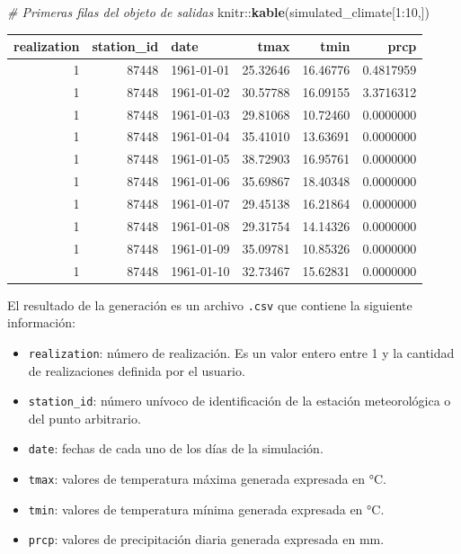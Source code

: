 \documentclass[
]{article}
\newenvironment{Shaded}{}{}
\newcommand{\CommentTok}[1]{\textcolor[rgb]{0.38,0.63,0.69}{\textit{#1}}}
\newcommand{\DecValTok}[1]{\textcolor[rgb]{0.25,0.63,0.44}{#1}}
\newcommand{\KeywordTok}[1]{\textcolor[rgb]{0.00,0.44,0.13}{\textbf{#1}}}
\newcommand{\NormalTok}[1]{#1}
\newcommand{\OperatorTok}[1]{\textcolor[rgb]{0.40,0.40,0.40}{#1}}
\providecommand{\tightlist}{%
  \setlength{\itemsep}{0pt}\setlength{\parskip}{0pt}}
\begin{document}
\begin{Shaded}
\begin{Highlighting}[]
\CommentTok{# Primeras filas del objeto de salidas}
\NormalTok{knitr}\OperatorTok{::}\KeywordTok{kable}\NormalTok{(simulated_climate[}\DecValTok{1}\OperatorTok{:}\DecValTok{10}\NormalTok{,])}
\end{Highlighting}
\end{Shaded}

\begin{tabular}{r|r|l|r|r|r}
\hline
realization & station\_id & date & tmax & tmin & prcp\\
\hline
1 & 87448 & 1961-01-01 & 25.32646 & 16.46776 & 0.4817959\\
\hline
1 & 87448 & 1961-01-02 & 30.57788 & 16.09155 & 3.3716312\\
\hline
1 & 87448 & 1961-01-03 & 29.81068 & 10.72460 & 0.0000000\\
\hline
1 & 87448 & 1961-01-04 & 35.41010 & 13.63691 & 0.0000000\\
\hline
1 & 87448 & 1961-01-05 & 38.72903 & 16.95761 & 0.0000000\\
\hline
1 & 87448 & 1961-01-06 & 35.69867 & 18.40348 & 0.0000000\\
\hline
1 & 87448 & 1961-01-07 & 29.45138 & 16.21864 & 0.0000000\\
\hline
1 & 87448 & 1961-01-08 & 29.31754 & 14.14326 & 0.0000000\\
\hline
1 & 87448 & 1961-01-09 & 35.09781 & 10.85326 & 0.0000000\\
\hline
1 & 87448 & 1961-01-10 & 32.73467 & 15.62831 & 0.0000000\\
\hline
\end{tabular}

El resultado de la generación es un archivo \texttt{.csv} que contiene la siguiente información:

\begin{itemize}
\tightlist
\item
  \texttt{realization}: número de realización. Es un valor entero entre 1 y la cantidad de realizaciones definida por el usuario.
\item
  \texttt{station\_id}: número unívoco de identificación de la estación meteorológica o del punto arbitrario.
\item
  \texttt{date}: fechas de cada uno de los días de la simulación.
\item
  \texttt{tmax}: valores de temperatura máxima generada expresada en °C.
\item
  \texttt{tmin}: valores de temperatura mínima generada expresada en °C.
\item
  \texttt{prcp}: valores de precipitación diaria generada expresada en mm.
\end{itemize}
\end{document}
